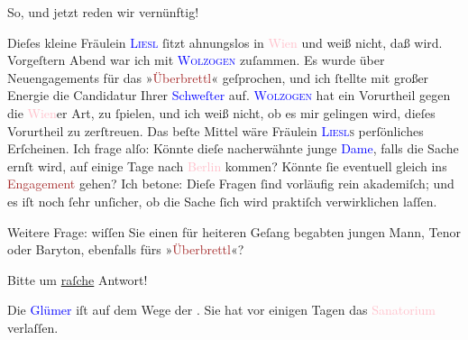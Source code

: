 \pstart
           So, und jetzt reden wir vernünftig!\pend
           
\pstart
           Dieſes kleine Fräulein \textsc{\textcolor{blue}{Liesl}{}\ledrightnote{\textcolor{blue}{Elisabeth Steinrück}}} ſitzt ahnungslos in \textcolor{pink}{Wien}{}\ledrightnote{\textcolor{pink}{Wien}} und weiß nicht, daß
                  \label{K_L03525-5v}\label{K_L03525-5h} wird. Vorgeſtern{ }Abend war ich mit \textsc{\textcolor{blue}{Wolzogen}{}\ledrightnote{\textcolor{blue}{Ernst von Wolzogen}}} zuſammen. Es wurde über Neuengagements für das »\textcolor{brown}{Überbrettl}{}\ledrightnote{\textcolor{brown}{Überbrettl}}« geſprochen, und ich ſtellte mit großer Energie die Candidatur
               Ihrer \textcolor{blue}{Schweſter}{}\ledrightnote{{$\rightarrow$}\textcolor{blue}{Elisabeth Steinrück}} auf. \textsc{\textcolor{blue}{Wolzogen}{}\ledrightnote{\textcolor{blue}{Ernst von Wolzogen}}} hat ein Vorurtheil gegen die \textcolor{pink}{Wien}{}\ledrightnote{\textcolor{pink}{Wien}}er Art, zu
               ſpielen, und ich weiß nicht, ob es mir gelingen wird, dieſes Vorurtheil zu
               zerſtreuen. Das beſte Mittel wäre Fräulein \textsc{\textcolor{blue}{Liesl}{}\ledrightnote{\textcolor{blue}{Elisabeth Steinrück}}s} perſönliches Erſcheinen. Ich
               frage alſo: Könnte dieſe {\pb} nacherwähnte junge \textcolor{blue}{Dame}{}\ledrightnote{{$\rightarrow$}\textcolor{blue}{Elisabeth Steinrück}}, falls die Sache ernſt
               wird, auf einige Tage nach \textcolor{pink}{Berlin}{}\ledrightnote{\textcolor{pink}{Berlin}} kommen? Könnte
               ſie eventuell gleich ins \textcolor{brown}{Engagement}{}\ledrightnote{{$\rightarrow$}\textcolor{brown}{Überbrettl}} gehen? Ich betone: Dieſe Fragen ſind vorläufig rein akademiſch;
               und es iſt noch ſehr unſicher, ob die Sache ſich wird praktiſch verwirklichen
               laſſen.\pend
           
\pstart
           Weitere Frage: wiſſen Sie einen für heiteren Geſang begabten jungen Mann, {\pb}Tenor oder Baryton, ebenfalls fürs »\textcolor{brown}{Überbrettl}{}\ledrightnote{\textcolor{brown}{Überbrettl}}«?\pend
           
\pstart
           Bitte um \uline{raſche} Antwort!\pend
           
\pstart
           Die \textcolor{blue}{Glümer}{}\ledrightnote{\textcolor{blue}{Marie Glümer}} iſt auf dem Wege der \label{K_L03525-6v}\label{K_L03525-6h}.
               Sie hat vor einigen Tagen das \textcolor{pink}{Sanatorium}{}\ledrightnote{\textcolor{pink}{?? [Sanatorium]}}
               verlaſſen.\pend
           
